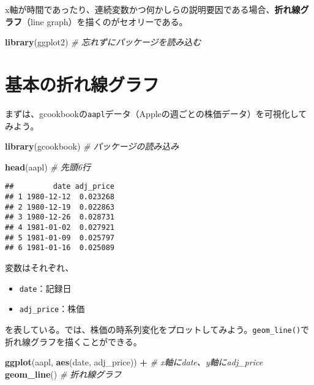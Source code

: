 \documentclass[]{book}
\newenvironment{Shaded}{\begin{snugshade}}{\end{snugshade}}
\newcommand{\KeywordTok}[1]{\textcolor[rgb]{0.13,0.29,0.53}{\textbf{#1}}}
\newcommand{\StringTok}[1]{\textcolor[rgb]{0.31,0.60,0.02}{#1}}
\newcommand{\CommentTok}[1]{\textcolor[rgb]{0.56,0.35,0.01}{\textit{#1}}}
\newcommand{\OperatorTok}[1]{\textcolor[rgb]{0.81,0.36,0.00}{\textbf{#1}}}
\newcommand{\NormalTok}[1]{#1}
\begin{document}
x軸が時間であったり、連続変数かつ何かしらの説明要因である場合、\textbf{折れ線グラフ}（line
graph）を描くのがセオリーである。

\begin{Shaded}
\begin{Highlighting}[]
\KeywordTok{library}\NormalTok{(ggplot2) }\CommentTok{# 忘れずにパッケージを読み込む}
\end{Highlighting}
\end{Shaded}

\section{基本の折れ線グラフ}

まずは、gcookbookの\texttt{aapl}データ（Appleの週ごとの株価データ）を可視化してみよう。

\begin{Shaded}
\begin{Highlighting}[]
\KeywordTok{library}\NormalTok{(gcookbook) }\CommentTok{# パッケージの読み込み}
\end{Highlighting}
\end{Shaded}

\begin{Shaded}
\begin{Highlighting}[]
\KeywordTok{head}\NormalTok{(aapl) }\CommentTok{# 先頭6行}
\end{Highlighting}
\end{Shaded}

\begin{verbatim}
##         date adj_price
## 1 1980-12-12  0.023268
## 2 1980-12-19  0.022863
## 3 1980-12-26  0.028731
## 4 1981-01-02  0.027921
## 5 1981-01-09  0.025797
## 6 1981-01-16  0.025089
\end{verbatim}

変数はそれぞれ、

\begin{itemize}
\item
  \texttt{date}：記録日
\item
  \texttt{adj\_price}：株価
\end{itemize}

を表している。では、株価の時系列変化をプロットしてみよう。\texttt{geom\_line()}で折れ線グラフを描くことができる。



\begin{Shaded}
\begin{Highlighting}[]
\KeywordTok{ggplot}\NormalTok{(aapl, }\KeywordTok{aes}\NormalTok{(date, adj_price)) }\OperatorTok{+}\StringTok{ }\CommentTok{# x軸にdate、y軸にadj_price}
\StringTok{  }\KeywordTok{geom_line}\NormalTok{() }\CommentTok{# 折れ線グラフ}
\end{Highlighting}
\end{Shaded}
\end{document}

